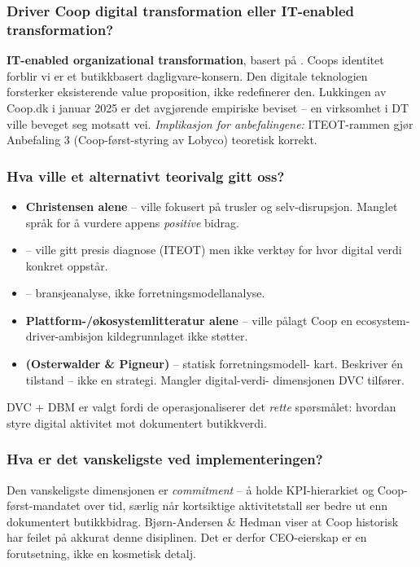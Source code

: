 \subsubsection*{\guillemotleft{}Driver Coop digital transformation eller IT-enabled
transformation?\guillemotright{}}
\textbf{IT-enabled organizational transformation}, basert på . Coops identitet forblir \guillemotleft{}vi er et butikkbasert dagligvare-konsern\guillemotright{}.
Den digitale teknologien forsterker eksisterende value proposition, ikke
redefinerer den. Lukkingen av Coop.dk i januar 2025 er det avgjørende
empiriske beviset -- en virksomhet i DT ville beveget seg motsatt vei.
\emph{Implikasjon for anbefalingene:} ITEOT-rammen gjør Anbefaling 3
(Coop-først-styring av Lobyco) teoretisk korrekt.

\subsubsection*{\guillemotleft{}Hva ville et alternativt teorivalg gitt oss?\guillemotright{}}
\begin{itemize}
  \item \textbf{Christensen alene} -- ville fokusert på trusler og
    selv-disrupsjon. Manglet språk for å vurdere appens \emph{positive}
    bidrag.
  \item \textbf{} -- ville gitt presis diagnose (ITEOT)
    men ikke verktøy for hvor digital verdi konkret oppstår.
  \item \textbf{} -- bransjeanalyse, ikke
    forretningsmodellanalyse.
  \item \textbf{Plattform-/økosystemlitteratur alene} -- ville pålagt Coop en
    ecosystem-driver-ambisjon kildegrunnlaget ikke støtter.
  \item \textbf{ (Osterwalder \& Pigneur)} -- statisk forretningsmodell-
    kart. Beskriver én tilstand -- ikke en strategi. Mangler digital-verdi-
    dimensjonen DVC tilfører.
\end{itemize}
DVC + DBM er valgt fordi de operasjonaliserer det \emph{rette} spørsmålet:
hvordan styre digital aktivitet mot dokumentert butikkverdi.

\subsubsection*{\guillemotleft{}Hva er det vanskeligste ved implementeringen?\guillemotright{}}
Den vanskeligste dimensjonen er \emph{commitment} -- å holde KPI-hierarkiet
og Coop-først-mandatet over tid, særlig når kortsiktige aktivitetstall ser
bedre ut enn dokumentert butikkbidrag. Bjørn-Andersen \& Hedman viser at
Coop historisk har feilet på akkurat denne disiplinen. Det er derfor
CEO-eierskap er en forutsetning, ikke en kosmetisk detalj.

